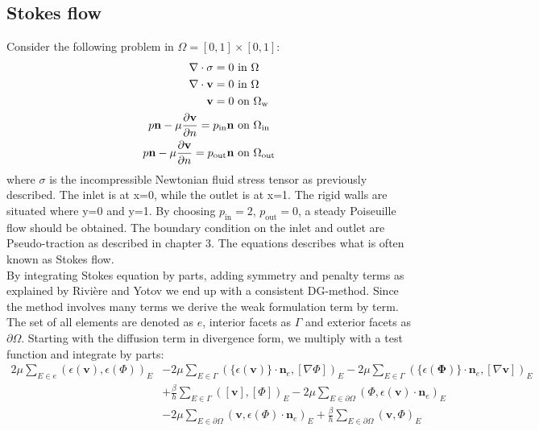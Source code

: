 \subsection{Stokes flow}
Consider the following problem in $\Omega = [0,1]\times[0,1]$:
\begin{align}
\nabla \cdot \sigma = 0 & \text{ in } \Omega \\
\nabla \cdot \mathbf{v} =  0 & \text{ in } \Omega\\
\mathbf{v} = 0 & \text{ on } \Omega_{\text{w}} \\
p \mathbf{n} - \mu \frac{\partial \mathbf{v}}{\partial n} = p_{\text{in}}\mathbf{n} & \text{ on } \Omega_{\text{in}} \\
p \mathbf{n} - \mu \frac{\partial \mathbf{v}}{\partial n} = p_{\text{out}}\mathbf{n} & \text{ on } \Omega_{\text{out}} \\
\end{align}
where $\sigma$ is the incompressible Newtonian fluid stress tensor as previously described. The inlet is at x=0, while the outlet is at x=1. The rigid walls are situated where y=0 and y=1. By choosing $p_{\text{in}} = 2$, $p_{\text{out}} = 0$, a steady Poiseuille flow should be obtained. The boundary condition on the inlet and outlet are Pseudo-traction as described in chapter 3. The equations describes what is often known as Stokes flow.  \\
By integrating Stokes equation by parts, adding symmetry and penalty terms as explained by Rivi{\`e}re and Yotov \cite{Rivi05} we end up with a consistent DG-method. Since the method involves many terms we derive the weak formulation term by term. The set of all elements are denoted as $e$, interior facets as $\Gamma$ and exterior facets as $\partial \Omega$. Starting with the diffusion term in divergence form, we multiply with a test function and integrate by parts:
\begin{align}
	2\mu \sum_{E \in e} (\epsilon(\mathbf{v}), \epsilon(\Phi))_E &
   -2\mu \sum_{E \in \Gamma}(\{\epsilon(\mathbf{v}) \} \cdot \mathbf{n}_e, [ \nabla \Phi ])_E 
   -2\mu \sum_{E \in \Gamma}(\{\epsilon(\mathbf{\Phi}) \} \cdot \mathbf{n}_e, [ \nabla \mathbf{v} ])_E \\
	& + \frac{\beta}{h} \sum_{E \in \Gamma}([\mathbf{v}],[\Phi])_E 
	-2\mu \sum_{E \in \partial \Omega}(\Phi,  \epsilon( \mathbf{v}) \cdot \mathbf{n}_e)_E \\
   & -2\mu \sum_{E \in \partial \Omega}(\mathbf{v},  \epsilon( \Phi)  \cdot \mathbf{n}_e)_E 
	+ \frac{\beta}{h} \sum_{E \in \partial \Omega}(\mathbf{v},\Phi)_E 
 \label {Diffusion}
\end{align}
